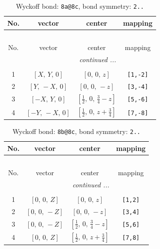 \documentclass[fleqn,8pt]{jsarticle}
\begin{document}
\begin{longtable}{cccc}
\caption{Wyckoff bond: {\tt 8a@8c}, bond symmetry: {\tt 2..}}
 \\
 \hline \hline
No. & vector & center & mapping \\ \hline \endfirsthead

\multicolumn{3}{l}{\tablename\ \thetable{}} \\
 \hline \hline
No. & vector & center & mapping \\ \hline \endhead

 \hline \hline
\multicolumn{3}{r}{\footnotesize\it continued ...} \\ \endfoot

 \hline \hline
\multicolumn{3}{r}{} \\ \endlastfoot

1 & $\left[ X,\, Y,\, 0 \right]$ & $\left[ 0,\, 0,\, z \right]$ & {\tt [1,-2]} \\ \hline
2 & $\left[ Y,\, - X,\, 0 \right]$ & $\left[ 0,\, 0,\, - z \right]$ & {\tt [3,-4]} \\ \hline
3 & $\left[ - X,\, Y,\, 0 \right]$ & $\left[ \frac{1}{2},\, 0,\, \frac{3}{4} - z \right]$ & {\tt [5,-6]} \\ \hline
4 & $\left[ - Y,\, - X,\, 0 \right]$ & $\left[ \frac{1}{2},\, 0,\, z + \frac{3}{4} \right]$ & {\tt [7,-8]} \\
\end{longtable}
\renewcommand{\arraystretch}{1.2}
\begin{longtable}{cccc}
\caption{Wyckoff bond: {\tt 8b@8c}, bond symmetry: {\tt 2..}}
 \\
 \hline \hline
No. & vector & center & mapping \\ \hline \endfirsthead

\multicolumn{3}{l}{\tablename\ \thetable{}} \\
 \hline \hline
No. & vector & center & mapping \\ \hline \endhead

 \hline \hline
\multicolumn{3}{r}{\footnotesize\it continued ...} \\ \endfoot

 \hline \hline
\multicolumn{3}{r}{} \\ \endlastfoot

1 & $\left[ 0,\, 0,\, Z \right]$ & $\left[ 0,\, 0,\, z \right]$ & {\tt [1,2]} \\ \hline
2 & $\left[ 0,\, 0,\, - Z \right]$ & $\left[ 0,\, 0,\, - z \right]$ & {\tt [3,4]} \\ \hline
3 & $\left[ 0,\, 0,\, - Z \right]$ & $\left[ \frac{1}{2},\, 0,\, \frac{3}{4} - z \right]$ & {\tt [5,6]} \\ \hline
4 & $\left[ 0,\, 0,\, Z \right]$ & $\left[ \frac{1}{2},\, 0,\, z + \frac{3}{4} \right]$ & {\tt [7,8]} \\
\end{longtable}
\end{document}

